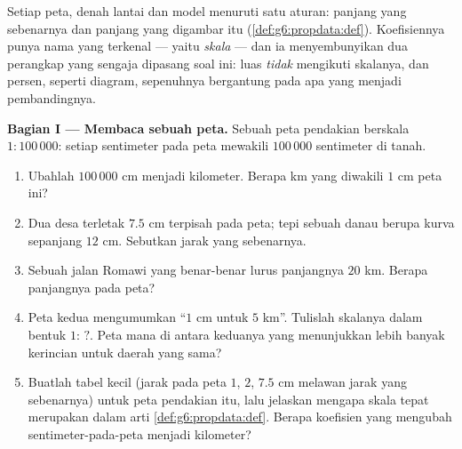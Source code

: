 \begin{problem}
\label{pb:g6:propdata:1}
Setiap peta, denah lantai dan model menuruti satu aturan: panjang
yang sebenarnya dan panjang yang digambar itu \emph{}
(\cref{def:g6:propdata:def}). Koefisiennya punya nama yang terkenal
--- yaitu \emph{skala} --- dan ia menyembunyikan dua
perangkap yang sengaja dipasang soal ini: luas \emph{tidak} mengikuti
skalanya, dan persen, seperti diagram, sepenuhnya bergantung pada apa
yang menjadi pembandingnya.

\medskip
\noindent\textbf{Bagian I --- Membaca sebuah peta.}
Sebuah peta pendakian berskala $1:100\,000$: setiap sentimeter pada
peta mewakili $100\,000$ sentimeter di tanah.
\begin{enumerate}
  \item Ubahlah $100\,000$ cm menjadi kilometer. Berapa km yang
        diwakili $1$ cm peta ini?
  \item Dua desa terletak $7.5$ cm terpisah pada peta; tepi sebuah
        danau berupa kurva sepanjang $12$ cm. Sebutkan jarak yang
        sebenarnya.
  \item Sebuah jalan Romawi yang benar-benar lurus panjangnya $20$ km.
        Berapa panjangnya pada peta?
  \item Peta kedua mengumumkan ``$1$ cm untuk $5$ km''. Tulislah
        skalanya dalam bentuk $1: \,?$. Peta mana di antara keduanya
        yang menunjukkan lebih banyak kerincian untuk daerah yang sama?
  \item Buatlah tabel kecil (jarak pada peta $1$, $2$, $7.5$ cm
        melawan jarak yang sebenarnya) untuk peta pendakian itu, lalu
        jelaskan mengapa skala tepat merupakan 
        dalam arti \cref{def:g6:propdata:def}. Berapa koefisien yang
        mengubah sentimeter-pada-peta menjadi kilometer?
\end{enumerate}


\end{problem}

